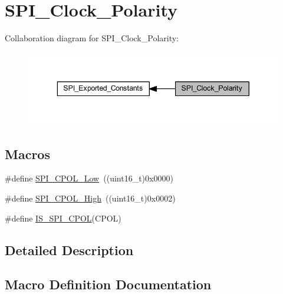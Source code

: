 \hypertarget{group___s_p_i___clock___polarity}{}\section{S\+P\+I\+\_\+\+Clock\+\_\+\+Polarity}
\label{group___s_p_i___clock___polarity}
Collaboration diagram for S\+P\+I\+\_\+\+Clock\+\_\+\+Polarity\+:
\nopagebreak
\begin{figure}[H]
\begin{center}
\leavevmode
\includegraphics[width=343pt]{group___s_p_i___clock___polarity}
\end{center}
\end{figure}
\subsection*{Macros}
\begin{DoxyCompactItemize}
\item 
\#define \hyperlink{group___s_p_i___clock___polarity_ga3dbc0234c4b4e7c37137e7c189f3c085}{S\+P\+I\+\_\+\+C\+P\+O\+L\+\_\+\+Low}~((uint16\+\_\+t)0x0000)
\item 
\#define \hyperlink{group___s_p_i___clock___polarity_ga4431f2edf42f8298d5bbe693351edbb0}{S\+P\+I\+\_\+\+C\+P\+O\+L\+\_\+\+High}~((uint16\+\_\+t)0x0002)
\item 
\#define \hyperlink{group___s_p_i___clock___polarity_gafc1cc5b1ff7e801a409a7a1e6047acf9}{I\+S\+\_\+\+S\+P\+I\+\_\+\+C\+P\+OL}(C\+P\+OL)
\end{DoxyCompactItemize}


\subsection{Detailed Description}


\subsection{Macro Definition Documentation}
\mbox{\label{group___s_p_i___clock___polarity_gafc1cc5b1ff7e801a409a7a1e6047acf9}} 

